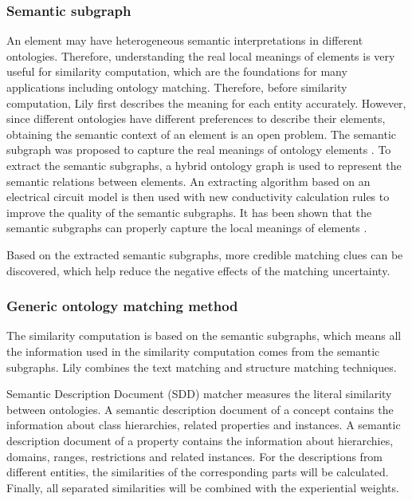 \documentclass{llncs}
\begin{document}
\subsubsection{Semantic subgraph} An element may have heterogeneous semantic interpretations in different ontologies. Therefore, understanding the real local meanings of elements is very useful for similarity computation, which are the foundations for many applications including ontology matching. Therefore, before similarity computation, Lily first describes the meaning for each entity accurately. However, since different ontologies have different preferences to describe their elements, obtaining the semantic context of an element is an open problem. The semantic subgraph was proposed to capture the real meanings of ontology elements \cite{subgraph}. To extract the semantic subgraphs, a hybrid ontology graph is used to represent the semantic relations between elements. An extracting algorithm based on an electrical circuit model is then used with new conductivity calculation rules to improve the quality of the semantic subgraphs. It has been shown that the semantic subgraphs can properly capture the local meanings of elements \cite{subgraph}. \par
Based on the extracted semantic subgraphs, more credible matching clues can be discovered, which help reduce the negative effects of the matching uncertainty. \par
\subsubsection{Generic ontology matching method} The similarity computation is based on the semantic subgraphs, which means all the information used in the similarity computation comes from the semantic subgraphs. Lily combines the text matching and structure matching techniques. \par
Semantic Description Document (SDD) matcher measures the literal similarity between ontologies. A semantic description document of a concept contains the information about class hierarchies, related properties and instances. A semantic description document of a property contains the information about hierarchies, domains, ranges, restrictions and related instances. For the descriptions from different entities, the similarities of the corresponding parts will be calculated. Finally, all separated similarities will be combined with the experiential weights. \par
\end{document}
